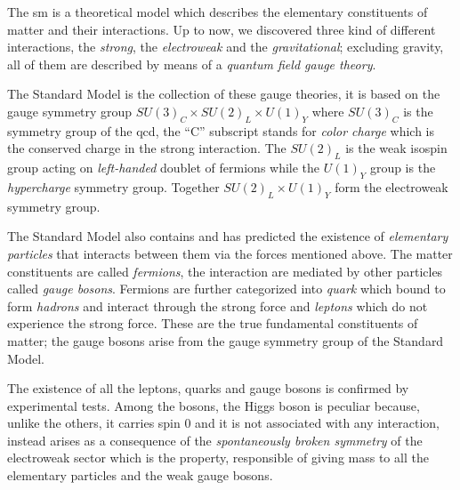 The \gls{sm} is a theoretical model which describes the elementary constituents
of matter and their interactions. Up to now, we discovered three kind of
different interactions, the \emph{strong}, the \emph{electroweak} and the
\emph{gravitational}; excluding gravity, all of them are described by means of a
\emph{quantum field gauge theory}.

The Standard Model is the collection of these gauge theories, it is based on the
gauge symmetry group $SU(3)_C \times SU(2)_L \times U(1)_Y$ where $SU(3)_C$ is
the symmetry group of the \gls{qcd}, the ``C'' subscript stands for \emph{color
  charge} which is the conserved charge in the strong interaction. The $SU(2)_L$
is the weak isospin group acting on \emph{left-handed} doublet of fermions while
the $U(1)_Y$ group is the \emph{hypercharge} symmetry group. Together
$SU(2)_L \times U(1)_Y$ form the electroweak symmetry group.

The Standard Model also contains and has predicted the existence of
\emph{elementary particles} that interacts between them via the forces mentioned
above. The matter constituents are called \emph{fermions}, the interaction are
mediated by other particles called \emph{gauge bosons}. Fermions are further
categorized into \emph{quark} which bound to form \emph{hadrons} and interact
through the strong force and \emph{leptons} which do not experience the strong
force. These are the true fundamental constituents of matter; the gauge bosons
arise from the gauge symmetry group of the Standard Model.

The existence of all the leptons, quarks and gauge bosons is confirmed by
experimental tests. Among the bosons, the Higgs boson is peculiar because,
unlike the others, it carries spin 0 and it is not associated with any
interaction, instead arises as a consequence of the \emph{spontaneously broken
  symmetry} of the electroweak sector which is the property, responsible of
giving mass to all the elementary particles and the weak gauge bosons.
